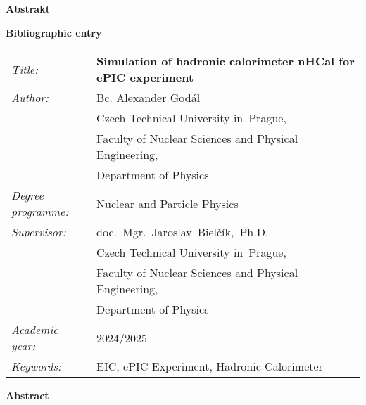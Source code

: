 \documentclass[a4paper, 12pt, oneside]{book}
\newcommand{\cvuten}{Czech Technical University in~Prague}
\newcommand{\fjfien}{Faculty of Nuclear Sciences and Physical Engineering}
\newcommand{\kfen}{Department of Physics}
\newcommand{\oboren}{Nuclear and Particle Physics}
\newcommand{\abstraktcz}{}
\newcommand{\nazeven}{Simulation of hadronic calorimeter nHCal for ePIC experiment} %
\newcommand{\klicovaslovaen}{EIC, ePIC Experiment, Hadronic Calorimeter}
\newcommand{\abstrakten}{}
\newcommand{\autor}{Bc. Alexander Godál}
\newcommand{\vedouci}{doc.~Mgr.~Jaroslav~Bielčík,~Ph.D.}
\newcommand{\konzultant}{Ing.~Alexandr~Prozorov,~Ph.D.}
\newcommand{\akrok}{2024/2025}
\begin{document}
\vspace{10mm}

{\bf Abstrakt}
\vspace{5mm}\\
\indent \abstraktcz





\newpage
\thispagestyle{empty}

{\bf Bibliographic entry}

\vspace{5mm} 

\begin{tabular}{p{100pt}l}
  {\em Title:} & {\bf \footnotesize\nazeven} \\
  {\em Author:} & \autor \\
   &\cvuten, \\   
   &\fjfien,\\
   &\kfen\\ 
  {\em Degree programme:} & \oboren\\ 
  {\em Supervisor:} & \vedouci \\ 
   &\cvuten, \\   
   &\fjfien,\\
   &\kfen\\ 
  {\em Academic year:} & \akrok\\
  {\em Keywords:} & \klicovaslovaen\\

\end{tabular}

\vspace{10mm}

{\bf Abstract}
\vspace{5mm}\\
\indent \abstrakten







\tableofcontents





%
% 



%
\end{document}
